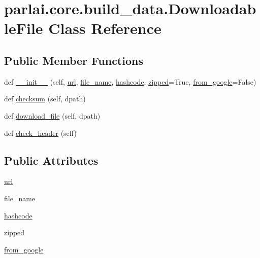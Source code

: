 \hypertarget{classparlai_1_1core_1_1build__data_1_1DownloadableFile}{}\section{parlai.\+core.\+build\+\_\+data.\+Downloadable\+File Class Reference}
\label{classparlai_1_1core_1_1build__data_1_1DownloadableFile}
\subsection*{Public Member Functions}
\begin{DoxyCompactItemize}
\item 
def \hyperlink{classparlai_1_1core_1_1build__data_1_1DownloadableFile_a674bba356b2fba56bb013b773233f2a7}{\+\_\+\+\_\+init\+\_\+\+\_\+} (self, \hyperlink{classparlai_1_1core_1_1build__data_1_1DownloadableFile_acb91fb3fd6168d4188ac901ed8c2453a}{url}, \hyperlink{classparlai_1_1core_1_1build__data_1_1DownloadableFile_aa4d0b0712e8e33759cd55024eae74958}{file\+\_\+name}, \hyperlink{classparlai_1_1core_1_1build__data_1_1DownloadableFile_aa161aa3a965714db66528f7af11a1613}{hashcode}, \hyperlink{classparlai_1_1core_1_1build__data_1_1DownloadableFile_a07640d0af013bbecf9db015754b66dbe}{zipped}=True, \hyperlink{classparlai_1_1core_1_1build__data_1_1DownloadableFile_a7217a744f70ba99fac9306eea01c5a08}{from\+\_\+google}=False)
\item 
def \hyperlink{classparlai_1_1core_1_1build__data_1_1DownloadableFile_aa69730e15f7f4a535e01e126ceb87f9d}{checksum} (self, dpath)
\item 
def \hyperlink{classparlai_1_1core_1_1build__data_1_1DownloadableFile_a2d7ae322b78f070c78050cbb41636bd4}{download\+\_\+file} (self, dpath)
\item 
def \hyperlink{classparlai_1_1core_1_1build__data_1_1DownloadableFile_ad08cadfb6f34f251368bf16fab6e557d}{check\+\_\+header} (self)
\end{DoxyCompactItemize}
\subsection*{Public Attributes}
\begin{DoxyCompactItemize}
\item 
\hyperlink{classparlai_1_1core_1_1build__data_1_1DownloadableFile_acb91fb3fd6168d4188ac901ed8c2453a}{url}
\item 
\hyperlink{classparlai_1_1core_1_1build__data_1_1DownloadableFile_aa4d0b0712e8e33759cd55024eae74958}{file\+\_\+name}
\item 
\hyperlink{classparlai_1_1core_1_1build__data_1_1DownloadableFile_aa161aa3a965714db66528f7af11a1613}{hashcode}
\item 
\hyperlink{classparlai_1_1core_1_1build__data_1_1DownloadableFile_a07640d0af013bbecf9db015754b66dbe}{zipped}
\item 
\hyperlink{classparlai_1_1core_1_1build__data_1_1DownloadableFile_a7217a744f70ba99fac9306eea01c5a08}{from\+\_\+google}
\end{DoxyCompactItemize}


